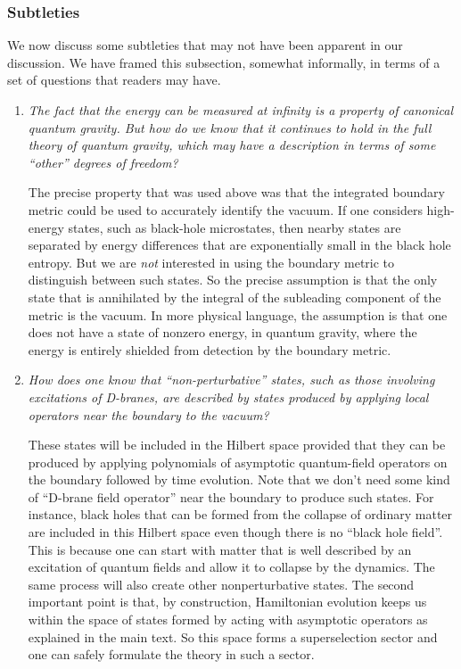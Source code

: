 \documentclass[12pt]{article}
\begin{document}
\subsubsection{Subtleties}
We now discuss some subtleties that may not have been apparent in our discussion. We have framed this subsection, somewhat informally,  in terms of a set of questions that readers may have.
\begin{enumerate}[qseries]
\item
{\em The fact that the energy can be measured at infinity is a property of canonical quantum gravity. But how do we know that it continues to hold in the full theory of quantum gravity, which may have a description in terms of some ``other'' degrees of freedom? }

The precise property that was used above was that the  integrated boundary  metric could be used to accurately identify the vacuum. If one considers high-energy states, such as black-hole microstates, then nearby states are separated by
energy differences that are exponentially small in the black hole entropy.  But we are {\em not} interested in using the boundary metric to distinguish between such states. So the precise assumption is that the  only state that is annihilated by the integral of the subleading component of the metric is the vacuum. In more physical language, the assumption is that one does not have a state of nonzero energy, in quantum gravity, where the energy is entirely shielded from detection by the boundary metric.
\item
{\em  How does one know that ``non-perturbative'' states, such as those involving excitations of D-branes, are described by states produced by applying local operators near the boundary to the vacuum?}

These states will be included in the Hilbert space provided that they can be produced by applying polynomials of asymptotic quantum-field operators on the boundary followed by time evolution.  Note that we don't need some kind of ``D-brane field operator''  near the boundary to produce such states. For instance,  black holes that can be formed from the collapse of ordinary matter are included in this Hilbert space even though there is no ``black hole field''.  This is because one can start with matter that is well described by an excitation of quantum fields and allow it to collapse by the dynamics. The same process will also create other nonperturbative states. The second important point is that, by construction, Hamiltonian evolution keeps us within the space of states formed by acting with asymptotic operators as explained in the main text. So this space forms a superselection sector and one can safely formulate the theory in such a sector.




\end{enumerate}
\end{document}
